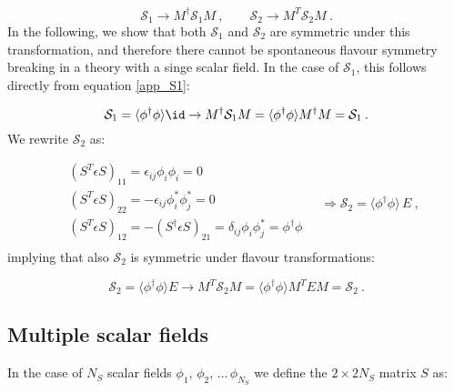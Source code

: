 \begin{equation}
\mathcal{S}_1 \to M^{\dagger} \mathcal{S}_1 M \: , \qquad \mathcal{S}_2 \to M^T \mathcal{S}_2 M \: .
\end{equation}
%
In the following, we show that both $\mathcal{S}_1$ and $\mathcal{S}_2$ are symmetric under this transformation, and therefore there cannot be spontaneous flavour symmetry breaking in a theory with a singe scalar field. In the case of $\mathcal{S}_1$, this follows directly from equation \ref{app_S1}:

\begin{equation}
\mathcal{S}_1 = \langle \phi^{\dagger} \phi \rangle \id \to M^{\dagger} \mathcal{S}_1 M = \langle \phi^{\dagger} \phi \rangle  M^{\dagger} M = \mathcal{S}_1 \: .
\end{equation}
%
We rewrite $\mathcal{S}_2$ as:

\begin{equation}
\begin{split}
& (S^T \epsilon S)_{11}=  \epsilon_{ij} \phi_i \phi_i = 0 \\
& (S^T \epsilon S)_{22} = -\epsilon_{ij} \phi^*_i \phi^*_j= 0 \\
& (S^T \epsilon S)_{12} = -(S^{\dagger} \epsilon S)_{21} = \delta_{ij} \phi_i \phi^*_j = \phi^{\dagger} \phi\\
\end{split}
\quad \Rightarrow  \mathcal{S}_2 = \langle \phi^{\dagger} \phi \rangle\, E \: ,
\label{app_S2}
\end{equation}
%
implying that also $\mathcal{S}_2$ is symmetric under flavour transformations:

\begin{equation}
\mathcal{S}_2 = \langle \phi^{\dagger} \phi \rangle E \to M^T \mathcal{S}_2 M = \langle \phi^{\dagger} \phi \rangle  M^T E M = \mathcal{S}_2 \: .
\end{equation}

\subsection{Multiple scalar fields}

In the case of $N_S$ scalar fields $\phi_1$, $\phi_2$, $\dots \, \phi_{N_S}$ we define the $2 \times 2N_S$ matrix $S$ as:

